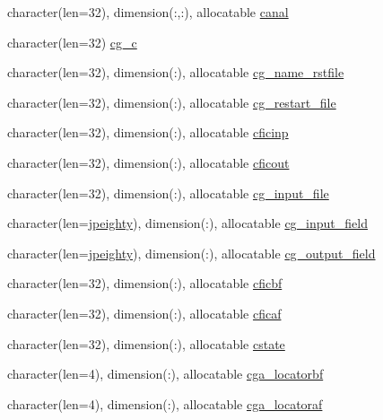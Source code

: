 \begin{DoxyCompactItemize}
character(len=32), dimension(\+:,\+:), allocatable \hyperlink{namespacemod__oasis__namcouple_a796058b6973a31bc719877570886be1a}{canal}
\item 
character(len=32) \hyperlink{namespacemod__oasis__namcouple_aa219f127d0d00ba6ecd3972c4c4ed47f}{cg\+\_\+c}
\item 
character(len=32), dimension(\+:), allocatable \hyperlink{namespacemod__oasis__namcouple_ac79429a9522aabddbe4ed68fd9571bec}{cg\+\_\+name\+\_\+rstfile}
\item 
character(len=32), dimension(\+:), allocatable \hyperlink{namespacemod__oasis__namcouple_a6eec7fe795bfb9c2058c7953c072d442}{cg\+\_\+restart\+\_\+file}
\item 
character(len=32), dimension(\+:), allocatable \hyperlink{namespacemod__oasis__namcouple_af17e746f51dcf0110428ebe55f6d7285}{cficinp}
\item 
character(len=32), dimension(\+:), allocatable \hyperlink{namespacemod__oasis__namcouple_a6760c3952138ef35a5e2cd7b79238eaf}{cficout}
\item 
character(len=32), dimension(\+:), allocatable \hyperlink{namespacemod__oasis__namcouple_a24f56cf88d79190f229d3fd1d62d17de}{cg\+\_\+input\+\_\+file}
\item 
character(len=\hyperlink{namespacemod__oasis__namcouple_a4fb10ad6e864dcbe34c4a8b02204a523}{jpeighty}), dimension(\+:), allocatable \hyperlink{namespacemod__oasis__namcouple_aad4d4857b4c424e1b0f0bcc0a01aa6e3}{cg\+\_\+input\+\_\+field}
\item 
character(len=\hyperlink{namespacemod__oasis__namcouple_a4fb10ad6e864dcbe34c4a8b02204a523}{jpeighty}), dimension(\+:), allocatable \hyperlink{namespacemod__oasis__namcouple_a1b680bf476776f3db085dc1f0009736c}{cg\+\_\+output\+\_\+field}
\item 
character(len=32), dimension(\+:), allocatable \hyperlink{namespacemod__oasis__namcouple_a0369f18e13cd2c3e4f9262499f967a6e}{cficbf}
\item 
character(len=32), dimension(\+:), allocatable \hyperlink{namespacemod__oasis__namcouple_a96bcbb80ff33c392d9dbb8d601878c95}{cficaf}
\item 
character(len=32), dimension(\+:), allocatable \hyperlink{namespacemod__oasis__namcouple_ac44c9e1c2c944879f81252fc1850ee19}{cstate}
\item 
character(len=4), dimension(\+:), allocatable \hyperlink{namespacemod__oasis__namcouple_ac22155599e9b49d57514dd1f7dc9928a}{cga\+\_\+locatorbf}
\item 
character(len=4), dimension(\+:), allocatable \hyperlink{namespacemod__oasis__namcouple_a6f4080d45f0b9be5a0466967f535b83b}{cga\+\_\+locatoraf}

\end{DoxyCompactItemize}
